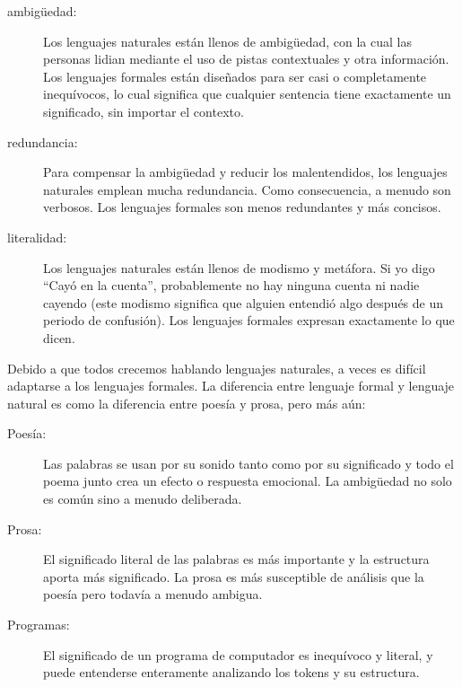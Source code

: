 \documentclass[10pt]{book}
\begin{document}
\begin{description}

\item[ambigüedad:] Los lenguajes naturales están llenos de ambigüedad, con la cual
las personas lidian mediante el uso de pistas contextuales y otra información.
Los lenguajes formales están diseñados para ser casi o completamente inequívocos,
lo cual significa que cualquier sentencia tiene exactamente un significado,
sin importar el contexto.

\item[redundancia:] Para compensar la ambigüedad y reducir
los malentendidos, los lenguajes naturales emplean mucha
redundancia.  Como consecuencia, a menudo son verbosos.  Los lenguajes formales
son menos redundantes y más concisos.

\item[literalidad:] Los lenguajes naturales están llenos de modismo y metáfora.
Si yo digo ``Cayó en la cuenta'', probablemente no hay ninguna cuenta ni
nadie cayendo (este modismo significa que alguien entendió algo
después de un periodo de confusión).  Los lenguajes formales
expresan exactamente lo que dicen.

\end{description}

Debido a que todos crecemos hablando lenguajes naturales, a veces es
difícil adaptarse a los lenguajes formales.  La diferencia entre lenguaje formal
y lenguaje natural es como la diferencia entre poesía y prosa, pero
más aún:  

\begin{description}

\item[Poesía:] Las palabras se usan por su sonido tanto como por
su significado y todo el poema junto crea un efecto o
respuesta emocional.  La ambigüedad no solo es común sino a menudo
deliberada.

\item[Prosa:] El significado literal de las palabras es más importante
y la estructura aporta más significado.  La prosa es más susceptible de
análisis que la poesía pero todavía a menudo ambigua.

\item[Programas:] El significado de un programa de computador es inequívoco
y literal, y puede entenderse enteramente analizando los
tokens y su estructura.

\end{description}
\end{document}
